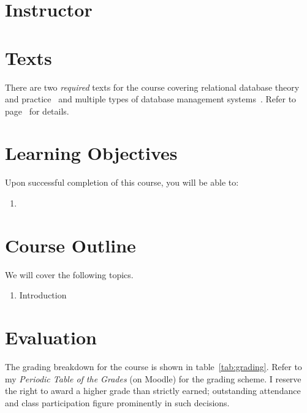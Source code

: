 \documentclass[11pt]{article}
\begin{document}

\section{Instructor}



\section{Texts}

There are two \emph{required} texts for the course
covering relational database theory and practice~\cite{harrington}
and multiple types of database management systems~\cite{7db7weeks}.
Refer to page~\pageref{sec:references}
for details.

\section{Learning Objectives}

Upon successful completion of this course,
you will be able to:
\begin{enumerate}
\item 
\end{enumerate}

\section{Course Outline}

We will cover the following topics.
\begin{enumerate}
\item Introduction
\end{enumerate}

\section{Evaluation}

The grading breakdown for the course
is shown in table~\ref{tab:grading}.
Refer to my \emph{Periodic Table of the Grades} (on Moodle)
for the grading scheme.
I reserve the right to award a higher grade than strictly earned;
outstanding attendance and class participation
figure prominently in such decisions.
\end{document}
